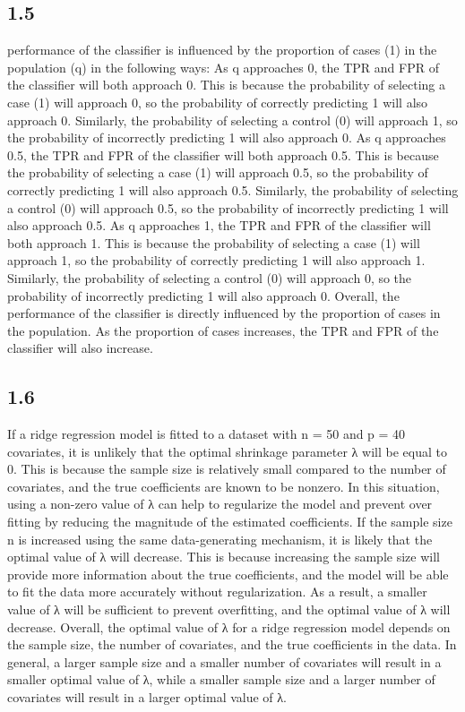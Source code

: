 \documentclass[
  11pt,
]{article}
\begin{document}
\hypertarget{section-4}{%
\subsection{1.5}\label{section-4}}

performance of the classifier is influenced by the proportion of cases
(1) in the population (q) in the following ways: As q approaches 0, the
TPR and FPR of the classifier will both approach 0. This is because the
probability of selecting a case (1) will approach 0, so the probability
of correctly predicting 1 will also approach 0. Similarly, the
probability of selecting a control (0) will approach 1, so the
probability of incorrectly predicting 1 will also approach 0. As q
approaches 0.5, the TPR and FPR of the classifier will both approach
0.5. This is because the probability of selecting a case (1) will
approach 0.5, so the probability of correctly predicting 1 will also
approach 0.5. Similarly, the probability of selecting a control (0) will
approach 0.5, so the probability of incorrectly predicting 1 will also
approach 0.5. As q approaches 1, the TPR and FPR of the classifier will
both approach 1. This is because the probability of selecting a case (1)
will approach 1, so the probability of correctly predicting 1 will also
approach 1. Similarly, the probability of selecting a control (0) will
approach 0, so the probability of incorrectly predicting 1 will also
approach 0. Overall, the performance of the classifier is directly
influenced by the proportion of cases in the population. As the
proportion of cases increases, the TPR and FPR of the classifier will
also increase.

\hypertarget{section-5}{%
\subsection{1.6}\label{section-5}}

If a ridge regression model is fitted to a dataset with n = 50 and p =
40 covariates, it is unlikely that the optimal shrinkage parameter λ
will be equal to 0. This is because the sample size is relatively small
compared to the number of covariates, and the true coefficients are
known to be nonzero. In this situation, using a non-zero value of λ can
help to regularize the model and prevent over fitting by reducing the
magnitude of the estimated coefficients. If the sample size n is
increased using the same data-generating mechanism, it is likely that
the optimal value of λ will decrease. This is because increasing the
sample size will provide more information about the true coefficients,
and the model will be able to fit the data more accurately without
regularization. As a result, a smaller value of λ will be sufficient to
prevent overfitting, and the optimal value of λ will decrease. Overall,
the optimal value of λ for a ridge regression model depends on the
sample size, the number of covariates, and the true coefficients in the
data. In general, a larger sample size and a smaller number of
covariates will result in a smaller optimal value of λ, while a smaller
sample size and a larger number of covariates will result in a larger
optimal value of λ.
\end{document}
